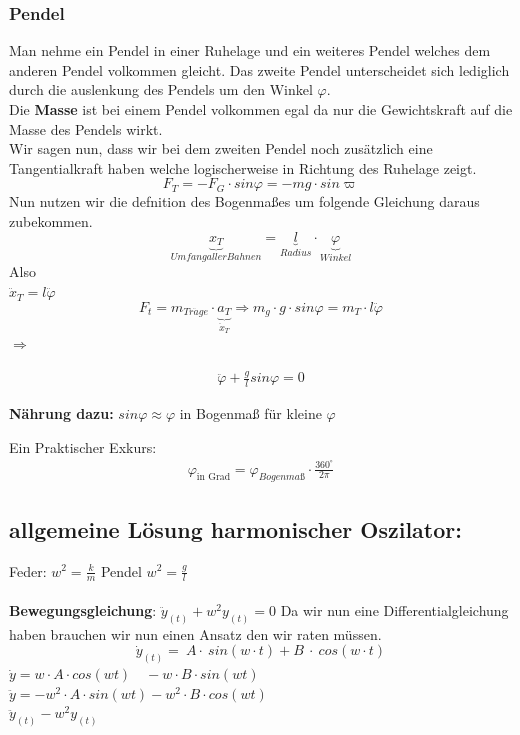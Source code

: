 \documentclass[11pt]{article}
\begin{document}
	\subsubsection{Pendel}
	Man nehme ein Pendel in einer Ruhelage und ein weiteres Pendel welches dem anderen Pendel volkommen gleicht. Das zweite Pendel unterscheidet sich lediglich durch die auslenkung des Pendels um den Winkel $\varphi$. \\ 
	Die \textbf{Masse} ist bei einem Pendel volkommen egal da nur die Gewichtskraft auf die Masse des Pendels wirkt.\\
	Wir sagen nun, dass wir bei dem zweiten Pendel noch zusätzlich eine Tangentialkraft haben welche logischerweise in Richtung des Ruhelage zeigt.
	\[ F_T = -F_G \cdot sin \varphi = -mg \cdot sin \varpi \]
	Nun nutzen wir die defnition des Bogenmaßes um folgende Gleichung daraus zubekommen.
	\[ \underbrace{x_T}_{Umfang aller Bahnen} = \underbrace{l}_{Radius} \cdot \underbrace{\varphi }_{Winkel} \]
	Also \\
	$\ddot{x}_T = l \ddot{\varphi}$
	\[ F_t = m_{Tr\ddot{a}ge} \cdot \underbrace{a_T}_{\ddot{x}_T}  \Rightarrow m_{g} \cdot g \cdot sin \varphi = m_T \cdot l \ddot{\varphi} \]
	$ \Rightarrow$
	\begin{tcolorbox}
		\begin{align}
		\ddot{\varphi} + \frac{g}{l}sin \varphi = 0
		\end{align}
	\end{tcolorbox}
	\textbf{Nährung dazu:} $sin \varphi \approx \varphi$ in Bogenmaß für kleine $\varphi$
	\begin{tcolorbox}
		Ein Praktischer Exkurs:
		\begin{align}
		\varphi_{\text{in Grad}} = \varphi_{Bogenmaß} \cdot \frac{360^\circ}{2\pi}
		\end{align}
	\end{tcolorbox}
	\subsection{allgemeine Lösung harmonischer Oszilator:}
	Feder: $w^2 = \frac{k}{m}$ \qquad
	Pendel $ w^2 = \frac{g}{l} $\\\\
	\textbf{Bewegungsgleichung}: $ \ddot{y}_{(t)} + w^2 y_{(t)} = 0$
	Da wir nun eine Differentialgleichung haben brauchen wir nun einen Ansatz den wir raten müssen.
	\[ \dot{y}_{(t)} =\ A \cdot\ sin (w\cdot t) + B\ \cdot\ cos(w \cdot t)  \]
	$\dot{y} = w \cdot A \cdot cos(wt)\quad  - w \cdot B \cdot sin (wt)$\\
	$\ddot{y} = -w^2 \cdot A \cdot sin (wt)- w^2 \cdot B \cdot cos(wt) $\\
	$ \ddot{y}_{(t)} - w^2 y_{(t)} $\\
\end{document}
